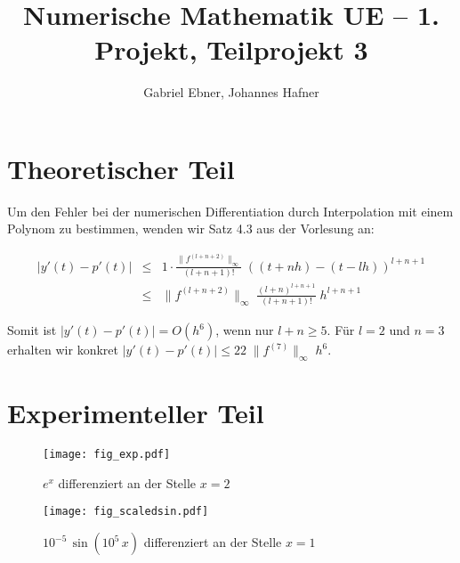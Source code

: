 \documentclass{scrartcl}
\begin{document}
\title{Numerische Mathematik UE -- 1. Projekt, Teilprojekt 3}
\author{Gabriel Ebner, Johannes Hafner}
\maketitle

\section{Theoretischer Teil}

Um den Fehler bei der numerischen Differentiation durch Interpolation mit einem
Polynom zu bestimmen, wenden wir Satz 4.3 aus der Vorlesung an:

\begin{eqnarray*}
|y'(t) - p'(t)| &\leq& 1 \cdot
    \frac{\|f^{(l+n+2)}\|_\infty}{(l+n+1)!}\; ((t+nh) - (t-lh))^{l+n+1} \\
  &\leq& \|f^{(l+n+2)}\|_\infty\; \frac{(l+n)^{l+n+1}}{(l+n+1)!}\; h^{l+n+1}
\end{eqnarray*}

Somit ist \(|y'(t)-p'(t)| = O(h^6)\), wenn nur \(l+n \geq 5\).  Für \(l=2\) und
\(n=3\) erhalten wir konkret \(|y'(t)-p'(t)| \leq 22\; \|f^{(7)}\|_\infty\; h^6\).

\section{Experimenteller Teil}

\begin{figure}[!htb]
\centering
\texttt{[image: fig\_exp.pdf]}
\caption{\(e^x\) differenziert an der Stelle \(x=2\)}
\label{fig:exp}
\end{figure}

\begin{figure}[!htb]
\centering
\texttt{[image: fig\_scaledsin.pdf]}
\caption{\(10^{-5}\, \sin(10^5\, x)\) differenziert an der Stelle \(x=1\)}
\label{fig:scaledsin}
\end{figure}
\end{document}
